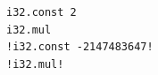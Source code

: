 {\begin{code}
\begin{minipage}[b]{0.32\linewidth}
\begin{minipage}[t]{0.46\linewidth}
            \begin{lstlisting}
i32.const 2
i32.mul
!i32.const -2147483647!
!i32.mul!
            \end{lstlisting}
        \end{minipage}
    \end{minipage}
    \end{code}
}

% 



% 




%




